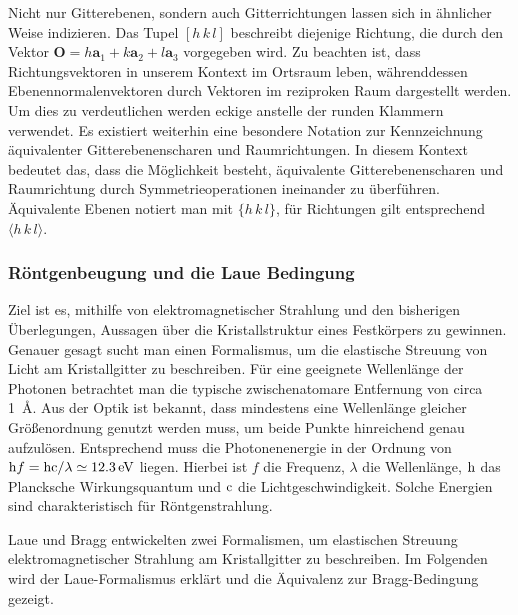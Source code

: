 Nicht nur Gitterebenen, sondern auch Gitterrichtungen lassen sich in ähnlicher Weise indizieren.
Das Tupel $[h\,k\,l]$ beschreibt diejenige Richtung, die durch den Vektor $\mathbf{O} = h\mathbf{a}_{1}+k\mathbf{a}_{2}+
l\mathbf{a}_{3}$ vorgegeben wird.
Zu beachten ist, dass Richtungsvektoren in unserem Kontext im Ortsraum leben,
währenddessen Ebenennormalenvektoren durch Vektoren im reziproken Raum dargestellt werden.
Um dies zu verdeutlichen werden eckige anstelle der runden Klammern verwendet.
Es existiert weiterhin eine besondere Notation zur Kennzeichnung äquivalenter Gitterebenenscharen und Raumrichtungen.
In diesem Kontext bedeutet das, dass die Möglichkeit besteht, äquivalente Gitterebenenscharen und Raumrichtung durch
Symmetrieoperationen ineinander zu überführen.
Äquivalente Ebenen notiert man mit $\{h \,k\, l \}$, für Richtungen gilt entsprechend $\langle h\, k \, l \rangle$.
\autocite[116]{Ashcroft}

\subsubsection{Röntgenbeugung und die Laue Bedingung}
Ziel ist es, mithilfe von elektromagnetischer Strahlung und den bisherigen Überlegungen, Aussagen über die
Kristallstruktur eines Festkörpers zu gewinnen.
Genauer gesagt sucht man einen Formalismus, um die elastische Streuung von Licht am Kristallgitter zu beschreiben.
Für eine geeignete Wellenlänge der Photonen betrachtet man die typische zwischenatomare Entfernung von circa
\qty{1}{\angstrom}.
Aus der Optik ist bekannt, dass mindestens eine Wellenlänge gleicher Größenordnung genutzt werden
muss, um beide Punkte hinreichend genau aufzulösen.
Entsprechend muss die Photonenenergie in der Ordnung von
$\mathrm{h} f =\mathrm{h} \mathrm{c} / \lambda \simeq \qty{12.3}{\electronvolt}$ liegen.
Hierbei ist $f$ die Frequenz, $\lambda$ die Wellenlänge, $\mathrm{h}$ das Plancksche Wirkungsquantum und $\mathrm{c}$ die
Lichtgeschwindigkeit.
Solche Energien sind charakteristisch für Röntgenstrahlung.

Laue und Bragg entwickelten zwei Formalismen, um elastischen Streuung elektromagnetischer Strahlung am Kristallgitter
zu beschreiben.
Im Folgenden wird der Laue-Formalismus erklärt und die Äquivalenz zur Bragg-Bedingung gezeigt.

